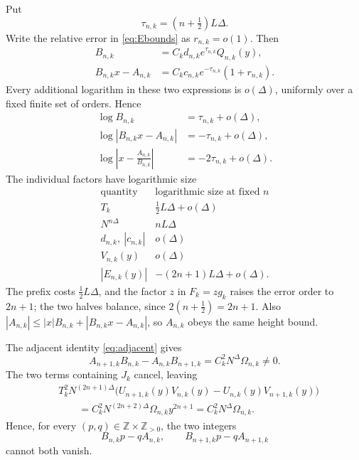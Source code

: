 \documentclass{amsart}
\numberwithin{equation}{section}
\newcommand{\Z}{\mathbb Z}
\begin{document}
Put
\begin{equation}\label{eq:scale}
\tau_{n,k}=(n+\tfrac12)L\Delta.
\end{equation}
Write the relative error in \eqref{eq:Ebounds} as $r_{n,k}=o(1)$.
Then
\begin{align}
B_{n,k}
 &=C_kd_{n,k}e^{\tau_{n,k}}Q_{n,k}(y),\label{eq:exactheight}\\
B_{n,k}x-A_{n,k}
 &=C_kc_{n,k}e^{-\tau_{n,k}}(1+r_{n,k}).\label{eq:exacterror}
\end{align}
Every additional logarithm in these two expressions is
$o(\Delta)$, uniformly over a fixed finite set of orders. Hence
\begin{align}
\log B_{n,k}&=\tau_{n,k}+o(\Delta),\label{eq:height}\\
\log|B_{n,k}x-A_{n,k}|&=-\tau_{n,k}+o(\Delta),\label{eq:error}\\
\log\left|x-\frac{A_{n,k}}{B_{n,k}}\right|
 &=-2\tau_{n,k}+o(\Delta).\label{eq:rationalerror}
\end{align}
The individual factors have logarithmic size
\[
\begin{array}{c|c}
\text{quantity}&\text{logarithmic size at fixed }n\\ \hline
T_k&\frac12L\Delta+o(\Delta)\\
N^{n\Delta}&nL\Delta\\
d_{n,k},\ |c_{n,k}|&o(\Delta)\\
V_{n,k}(y)&o(\Delta)\\
|E_{n,k}(y)|&-(2n+1)L\Delta+o(\Delta).
\end{array}
\]
The prefix costs $\tfrac12L\Delta$, and the factor $z$ in
$F_k=zg_k$ raises the error order to $2n+1$; the two halves balance,
since $2(n+\tfrac12)=2n+1$. Also
$|A_{n,k}|\le|x|B_{n,k}+|B_{n,k}x-A_{n,k}|$, so $A_{n,k}$
obeys the same height bound.

The adjacent identity \eqref{eq:adjacent} gives
\begin{equation}\label{eq:integerdet}
A_{n+1,k}B_{n,k}-A_{n,k}B_{n+1,k}
=C_k^2N^{\Delta}\Omega_{n,k}\ne0.
\end{equation}
The two terms containing $J_k$ cancel, leaving
\begin{align*}
&T_k^2N^{(2n+1)\Delta}
 \bigl(U_{n+1,k}(y)V_{n,k}(y)-U_{n,k}(y)V_{n+1,k}(y)\bigr)\\
&\qquad=C_k^2N^{(2n+2)\Delta}\Omega_{n,k}y^{2n+1}
 =C_k^2N^{\Delta}\Omega_{n,k}.
\end{align*}
Hence, for every $(p,q)\in\Z\times\Z_{>0}$, the two integers
\begin{equation}\label{eq:sourceintegers}
B_{n,k}p-qA_{n,k},\qquad B_{n+1,k}p-qA_{n+1,k}
\end{equation}
cannot both vanish.
\end{document}
